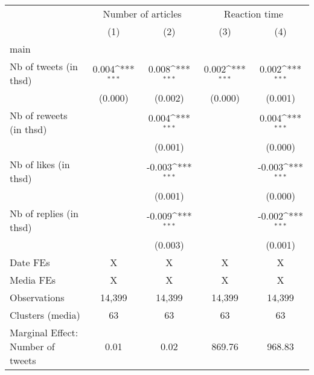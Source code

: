{
\def\sym#1{\ifmmode^{#1}\else\(^{#1}\)\fi}
\begin{tabular}{l*{4}{c}}
\hline\hline
                    &\multicolumn{2}{c}{Number of articles}     &\multicolumn{2}{c}{Reaction time}          \\\cmidrule(lr){2-3}\cmidrule(lr){4-5}
                    &\multicolumn{1}{c}{(1)}         &\multicolumn{1}{c}{(2)}         &\multicolumn{1}{c}{(3)}         &\multicolumn{1}{c}{(4)}         \\
\hline
main                &                     &                     &                     &                     \\
Nb of tweets (in thsd)&       0.004\sym{***}&       0.008\sym{***}&       0.002\sym{***}&       0.002\sym{***}\\
                    &     (0.000)         &     (0.002)         &     (0.000)         &     (0.001)         \\
Nb of reweets (in thsd)&                     &       0.004\sym{***}&                     &       0.004\sym{***}\\
                    &                     &     (0.001)         &                     &     (0.000)         \\
Nb of likes (in thsd)&                     &      -0.003\sym{***}&                     &      -0.003\sym{***}\\
                    &                     &     (0.001)         &                     &     (0.000)         \\
Nb of replies (in thsd)&                     &      -0.009\sym{***}&                     &      -0.002\sym{***}\\
                    &                     &     (0.003)         &                     &     (0.001)         \\
\hline
Date FEs            &           X         &           X         &           X         &           X         \\
Media FEs           &           X         &           X         &           X         &           X         \\
Observations        &      14,399         &      14,399         &      14,399         &      14,399         \\
Clusters (media)    &          63         &          63         &          63         &          63         \\
Marginal Effect: Number of tweets&        0.01         &        0.02         &      869.76         &      968.83         \\
\hline\hline
\end{tabular}
}
